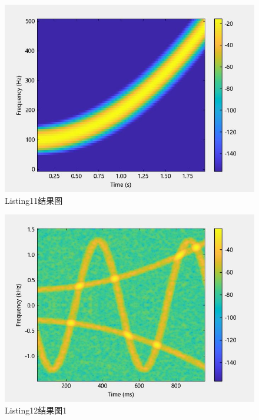 \documentclass{article}
\begin{document}
	
	\begin{figure}[htbp]
		\centering
		\includegraphics{hw5(11).jpeg}
		\caption{Listing11结果图}
		\label{fig11}
	\end{figure}
	
	\begin{figure}[htbp]
		\centering
		\includegraphics{hw5(12)-1.jpeg}
		\caption{Listing12结果图1}
		\label{fig12-1}
	\end{figure}
\end{document}
